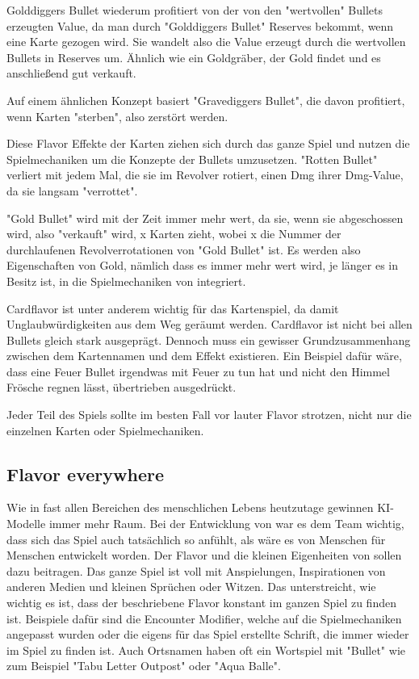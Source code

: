 Golddiggers Bullet wiederum profitiert von der von den "wertvollen" Bullets erzeugten Value, da man durch "Golddiggers Bullet" Reserves bekommt,
wenn eine Karte gezogen wird. Sie wandelt also die Value erzeugt durch die wertvollen Bullets in Reserves um.
Ähnlich wie ein Goldgräber, der Gold findet und es anschließend gut verkauft.

Auf einem ähnlichen Konzept basiert "Gravediggers Bullet", die davon profitiert, wenn Karten "sterben", also zerstört werden.



Diese Flavor Effekte der Karten ziehen sich durch das ganze Spiel und nutzen die Spielmechaniken um die Konzepte der Bullets umzusetzen.
"Rotten Bullet" \zB verliert mit jedem Mal, die sie im Revolver rotiert, einen Dmg ihrer Dmg-Value, da sie langsam "verrottet".


"Gold Bullet" wird mit der Zeit immer mehr wert, da sie, wenn sie abgeschossen wird, also "verkauft" wird, x Karten zieht,
wobei x die Nummer der durchlaufenen Revolverrotationen von "Gold Bullet" ist. Es werden also Eigenschaften von Gold,
nämlich dass es immer mehr wert wird, je länger es in Besitz ist, in die Spielmechaniken von \FF integriert.


Cardflavor ist unter anderem wichtig für das Kartenspiel, da damit Unglaubwürdigkeiten aus dem Weg geräumt werden.
Cardflavor ist nicht bei allen Bullets gleich stark ausgeprägt. Dennoch muss ein gewisser Grundzusammenhang zwischen dem
Kartennamen und dem Effekt existieren. Ein Beispiel dafür wäre, dass eine Feuer Bullet irgendwas mit Feuer zu tun hat und
nicht den Himmel Frösche regnen lässt, übertrieben ausgedrückt.


Jeder Teil des Spiels sollte im besten Fall vor lauter Flavor strotzen, nicht nur die einzelnen Karten oder Spielmechaniken.



\subsection{Flavor everywhere}\label{subsec:keinTeildesSpielesOhneFlavor}

Wie in fast allen Bereichen des menschlichen Lebens heutzutage gewinnen KI-Modelle immer mehr Raum. Bei der Entwicklung von \FF war es dem Team wichtig,
dass sich das Spiel auch tatsächlich so anfühlt, als wäre es von Menschen für Menschen entwickelt worden.
Der Flavor und die kleinen Eigenheiten von \FF sollen dazu beitragen.
Das ganze Spiel ist voll mit Anspielungen, Inspirationen von anderen Medien und kleinen Sprüchen oder Witzen.
Das unterstreicht, wie wichtig es ist, dass der beschriebene Flavor konstant im ganzen Spiel zu finden ist.
Beispiele dafür sind die Encounter Modifier, welche auf die Spielmechaniken
angepasst wurden oder die eigens für das Spiel erstellte Schrift, die immer wieder im Spiel zu finden ist. Auch Ortsnamen
haben oft ein Wortspiel mit "Bullet" wie zum Beispiel "Tabu Letter Outpost" oder "Aqua Balle".


